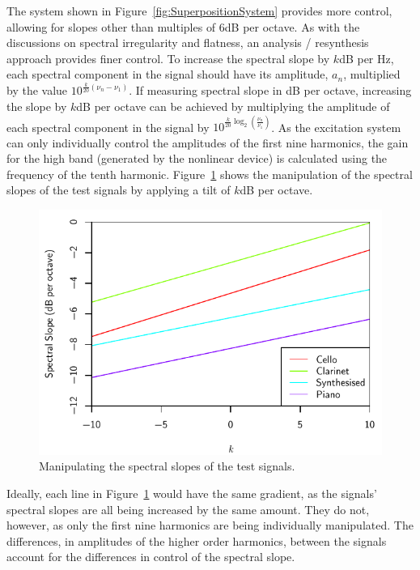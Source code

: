 		The system shown in Figure~\ref{fig:SuperpositionSystem} provides more control, allowing for slopes other
		than multiples of 6dB per octave. As with the discussions on spectral irregularity and flatness, an
		analysis / resynthesis approach provides finer control. To increase the spectral slope by $k$dB per Hz,
		each spectral component in the signal should have its amplitude, $a_{n}$, multiplied by the value
		$10^{\frac{k}{20}(\nu_{n} - \nu_{1})}$. If measuring spectral slope in dB per octave, increasing the slope
		by $k$dB per octave can be achieved by multiplying the amplitude of each spectral component in the signal
		by $10^{\frac{k}{20}\log_{2} \left( \frac{\nu_{n}}{\nu_{1}} \right)}$. As the excitation system can only
		individually control the amplitudes of the first nine harmonics, the gain for the high band (generated by
		the nonlinear device) is calculated using the frequency of the tenth harmonic.  Figure~\ref{fig:MoveSlopes}
		shows the manipulation of the spectral slopes of the test signals by applying a tilt of $k$dB per octave.

		\begin{figure}[h!]
			\centering
			\includegraphics{chapter6/Images/MoveSlopes.pdf}
			\caption{Manipulating the spectral slopes of the test signals.}
			\label{fig:MoveSlopes}
		\end{figure}

		Ideally, each line in Figure~\ref{fig:MoveSlopes} would have the same gradient, as the signals' spectral
		slopes are all being increased by the same amount. They do not, however, as only the first nine harmonics
		are being individually manipulated. The differences, in amplitudes of the higher order harmonics, between
		the signals account for the differences in control of the spectral slope.

